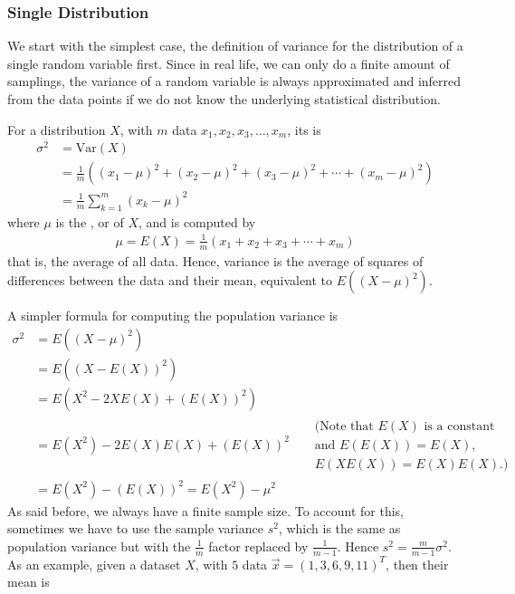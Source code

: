 \subsubsection{Single Distribution}
We start with the simplest case, the definition of variance for the distribution of a single random variable first. Since in real life, we can only do a finite amount of samplings, the variance of a random variable is always approximated and inferred from the data points if we do not know the underlying statistical distribution.
\begin{defn}
\label{defn:variance}
For a distribution $X$, with $m$ data $x_1, x_2, x_3, \ldots, x_m$, its  is
\begin{subequations}
\label{eqn:variance}
\begin{align}
\sigma^2 &= \text{Var}(X) \nonumber\\
&= \frac{1}{m} ((x_1 - \mu)^2 + (x_2 - \mu)^2 + (x_3 - \mu)^2 + \cdots + (x_m - \mu)^2) \\
&= \frac{1}{m} \sum_{k=1}^m (x_k - \mu)^2 \label{eqn:varianceb}
\end{align}    
\end{subequations}
where $\mu$ is the , or  of $X$, and is computed by
\begin{align}
\mu = E(X) = \frac{1}{m} (x_1 + x_2 + x_3 + \cdots + x_m)
\end{align}
that is, the average of all data. Hence, variance is the average of squares of differences between the data and their mean, equivalent to $E((X-\mu)^2)$.
\end{defn}
A simpler formula for computing the population variance is
\begin{align}
\sigma^2 &= E((X-\mu)^2) \nonumber \\
&= E((X-E(X))^2) \nonumber \\
&= E(X^2-2XE(X)+(E(X))^2) \nonumber \\
&= E(X^2) - 2E(X)E(X) + (E(X))^2 \nonumber & \begin{aligned} &\text{(Note that $E(X)$ is a constant}\\ &\text{and $E(E(X)) = E(X)$,} \\
&\text{$E(XE(X)) = E(X)E(X)$.)}\end{aligned} \\
&= E(X^2) - (E(X))^2 = E(X^2) - \mu^2 \label{eqn:varshortcut}
\end{align}
As said before, we always have a finite sample size. To account for this, sometimes we have to use the sample variance $s^2$, which is the same as population variance but with the $\frac{1}{m}$ factor replaced by $\frac{1}{m-1}$. Hence $s^2 = \frac{m}{m-1}\sigma^2$. As an example, given a dataset $X$, with $5$ data $\vec{x} = (1, 3, 6, 9, 11)^T$, then their mean is
